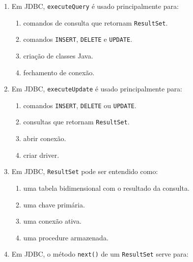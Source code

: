 \documentclass[12pt,a4paper]{article}
\begin{document}
\begin{enumerate}[label=\textbf{Q\arabic*.}]
\begin{enumerate}[label=\alph*)]
    \item ligados a variáveis do programa.
    \item apagados do banco.
    \item transformados em tabelas.
    \item convertidos obrigatoriamente para XML.
\end{enumerate}

\item Em JDBC, \texttt{executeQuery} é usado principalmente para:

\begin{enumerate}[label=\alph*)]
    \item comandos de consulta que retornam \texttt{ResultSet}.
    \item comandos \texttt{INSERT}, \texttt{DELETE} e \texttt{UPDATE}.
    \item criação de classes Java.
    \item fechamento de conexão.
\end{enumerate}

\item Em JDBC, \texttt{executeUpdate} é usado principalmente para:

\begin{enumerate}[label=\alph*)]
    \item comandos \texttt{INSERT}, \texttt{DELETE} ou \texttt{UPDATE}.
    \item consultas que retornam \texttt{ResultSet}.
    \item abrir conexão.
    \item criar driver.
\end{enumerate}

\item Em JDBC, \texttt{ResultSet} pode ser entendido como:

\begin{enumerate}[label=\alph*)]
    \item uma tabela bidimensional com o resultado da consulta.
    \item uma chave primária.
    \item uma conexão ativa.
    \item uma procedure armazenada.
\end{enumerate}

\item Em JDBC, o método \texttt{next()} de um \texttt{ResultSet} serve para:


\end{enumerate}
\end{document}

